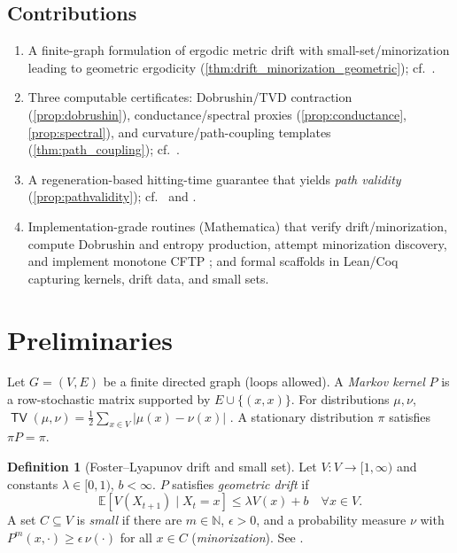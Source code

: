 \documentclass[11pt]{article}
\theoremstyle{plain}
\theoremstyle{definition}
\newtheorem{definition}[theorem]{Definition}
\theoremstyle{remark}
\DeclareMathOperator{\TV}{\mathsf{TV}}
\newcommand{\EE}{\mathbb{E}}
\newcommand{\NN}{\mathbb{N}}
\newcommand{\1}{\mathds{1}}
\begin{document}
\subsection{Contributions}
\begin{enumerate}[label=(C\arabic*)]
\item A finite-graph formulation of ergodic metric drift with small-set/minorization leading to geometric ergodicity (\cref{thm:drift_minorization_geometric}); cf.\ \cite{MeynTweedie2009,RobertsRosenthal2004,Nummelin1984}.
\item Three computable certificates: Dobrushin/TVD contraction (\cref{prop:dobrushin}), conductance/spectral proxies (\cref{prop:conductance}, \cref{prop:spectral}), and curvature/path-coupling templates (\cref{thm:path_coupling}); cf.\ \cite{Seneta2006,LevinPeresWilmer2009,BubleyDyer1997,Ollivier2009,JoulinOllivier2010}.
\item A regeneration-based hitting-time guarantee that yields \emph{path validity} (\cref{prop:pathvalidity}); cf.\ \cite[Ch.~15]{MeynTweedie2009} and \cite{RobertsRosenthal2004}.
\item Implementation-grade routines (Mathematica) that verify drift/minorization, compute Dobrushin and entropy production, attempt minorization discovery, and implement monotone CFTP \cite{ProppWilson1996}; and formal scaffolds in Lean/Coq capturing kernels, drift data, and small sets.
\end{enumerate}

\section{Preliminaries}
Let $G=(V,E)$ be a finite directed graph (loops allowed). A \emph{Markov kernel} $P$ is a row-stochastic matrix supported by $E\cup\{(x,x)\}$. For distributions $\mu,\nu$, $\TV(\mu,\nu)=\tfrac{1}{2}\sum_{x\in V}|\mu(x)-\nu(x)|$ \cite{LevinPeresWilmer2009}. A stationary distribution $\pi$ satisfies $\pi P=\pi$.

\begin{definition}[Foster--Lyapunov drift and small set]\label{def:driftSmall}
Let $V:V\to[1,\infty)$ and constants $\lambda\in[0,1)$, $b<\infty$. $P$ satisfies \emph{geometric drift} if
\[
\EE[V(X_{t+1})\mid X_t=x]\le \lambda V(x)+b\quad\forall x\in V.
\]
A set $C\subseteq V$ is \emph{small} if there are $m\in\NN$, $\epsilon>0$, and a probability measure $\nu$ with
$P^m(x,\cdot)\ge \epsilon\,\nu(\cdot)$ for all $x\in C$ (\emph{minorization}). See \cite{Nummelin1984,MeynTweedie2009}.
\end{definition}
\end{document}
